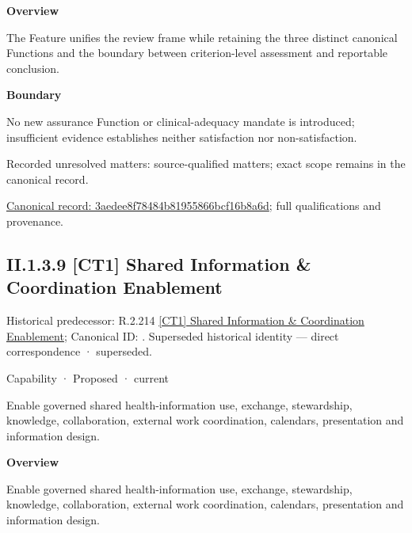 \textbf{Overview}



The Feature unifies the review frame while retaining the three distinct canonical Functions and the boundary between criterion-level assessment and reportable conclusion.



\textbf{Boundary}



No new assurance Function or clinical-adequacy mandate is introduced; insufficient evidence establishes neither satisfaction nor non-satisfaction.


{\small Recorded unresolved matters: source-qualified matters; exact scope remains in the canonical record.}\par
{\footnotesize \href{../../../../continuum/strategy/capability/feature/3aedee8f78484b81955866bcf16b8a6d.md}{Canonical record: 3aedee8f78484b81955866bcf16b8a6d}; full qualifications and provenance.}\par
\subsection*{II.1.3.9 [CT1] Shared Information \& Coordination Enablement}
\label{navigation:II.1.3.9}

{\small Historical predecessor: R.2.214 \hyperref[element:eeabb9c3c526404cbe4302906560fa7e]{[CT1] Shared Information \& Coordination Enablement}; Canonical ID: \texttt{}. Superseded historical identity — direct correspondence · superseded.}\par
\label{element:0062fcacae1740988b6be2bda2aa1674}
{\small Capability · Proposed · current}\par

Enable governed shared health-information use, exchange, stewardship, knowledge, collaboration, external work coordination, calendars, presentation and information design.



\textbf{Overview}



Enable governed shared health-information use, exchange, stewardship, knowledge, collaboration, external work coordination, calendars, presentation and information design.



